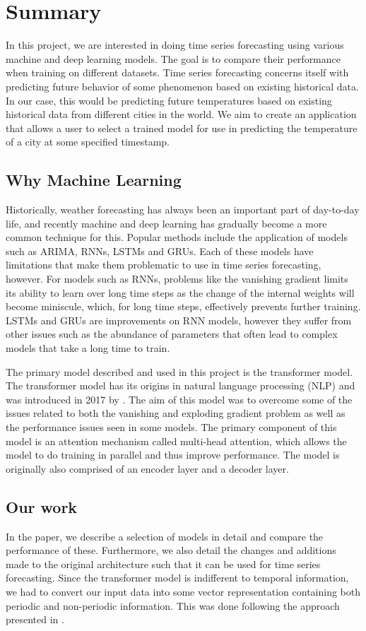 \section*{Summary}
In this project, we are interested in doing time series forecasting using various machine and deep learning models.
The goal is to compare their performance when training on different datasets.
Time series forecasting concerns itself with predicting future behavior of some phenomenon based on existing historical data.
In our case, this would be predicting future temperatures based on existing historical data from different cities in the world.
We aim to create an application that allows a user to select a trained model for use in predicting the temperature of a  city at some specified timestamp.

\subsection{Why Machine Learning}
Historically, weather forecasting has always been an important part of day-to-day life, and recently machine and deep learning has gradually become a more common technique for this.
Popular methods include the application of models such as ARIMA, RNNs, LSTMs and GRUs.
Each of these models have limitations that make them problematic to use in time series forecasting, however.
For models such as RNNs, problems like the vanishing gradient limits its ability to learn over long time steps as the change of the internal weights will become miniscule, which, for long time steps, effectively prevents further training.
LSTMs and GRUs are improvements on RNN models, however they suffer from other issues such as the abundance of parameters that often lead to complex models that take a long time to train.

The primary model described and used in this project is the transformer model.
The transformer model has its origins in natural language processing (NLP) and was introduced in 2017 by \citet{AttentionIsAllYouNeed}. 
The aim of this model was to overcome some of the issues related to both the vanishing and exploding gradient problem as well as the performance issues seen in some models.
The primary component of this model is an attention mechanism called multi-head attention, which allows the model to do training in parallel and thus improve performance. 
The model is originally also comprised of an encoder layer and a decoder layer. 

\subsection{Our work}
In the paper, we describe a selection of models in detail and compare the performance of these.
Furthermore, we also detail the changes and additions made to the original architecture such that it can be used for time series forecasting.
Since the transformer model is indifferent to temporal information, we had to convert our input data into some vector representation containing both periodic and non-periodic information.
This was done following the approach presented in \citet{time2vec}.

